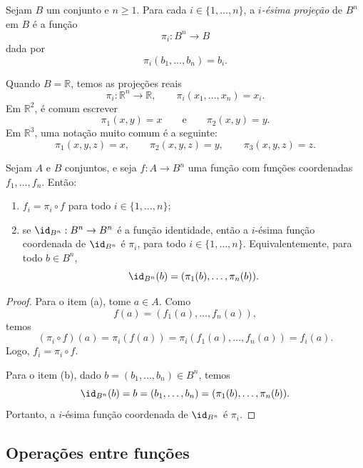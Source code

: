 \begin{definition}
    Sejam $B$ um conjunto e $n\geq 1$.
    Para cada $i\in\{1,\ldots,n\}$, a \emph{$i$-ésima projeção} de $B^n$ em $B$ é a função
    \[
        \pi_i:B^n\to B
    \]
    dada por
    \[
        \pi_i(b_1,\ldots,b_n)=b_i.
    \]
\end{definition}

Quando $B=\mathbb R$, temos as projeções reais
\[
    \pi_i:\mathbb R^n\to\mathbb R,
    \qquad
    \pi_i(x_1,\ldots,x_n)=x_i.
\]
Em $\mathbb R^2$, é comum escrever
\[
    \pi_1(x,y)=x
    \qquad\text{e}\qquad
    \pi_2(x,y)=y.
\]
Em $\mathbb R^3$, uma notação muito comum é a seguinte:
\[
    \pi_1(x,y,z)=x,\qquad
    \pi_2(x,y,z)=y,\qquad
    \pi_3(x,y,z)=z.
\]

\begin{proposition}
    Sejam $A$ e $B$ conjuntos, e seja $f:A\to B^n$ uma função com funções coordenadas $f_1,\ldots,f_n$.
    Então:
    \begin{enumerate}[label=(\alph*)]
        \item $f_i=\pi_i\circ f$ para todo $i\in\{1,\ldots,n\}$;
        \item se $\id_{B^n}:B^n\to B^n$ é a função identidade, então a $i$-ésima função coordenada de $\id_{B^n}$ é $\pi_i$, para todo $i\in\{1,\ldots,n\}$.
        Equivalentemente, para todo $b \in B^n$,
        \[
            \id_{B^n}(b)=(\pi_1(b),\ldots,\pi_n(b)).
        \]
    \end{enumerate}
\end{proposition}

\begin{proof}
    Para o item (a), tome $a\in A$.
    Como
    \[
        f(a)=(f_1(a),\ldots,f_n(a)),
    \]
    temos
    \[
        (\pi_i\circ f)(a)
        =
        \pi_i(f(a))
        =
        \pi_i(f_1(a),\ldots,f_n(a))
        =
        f_i(a).
    \]
    Logo, $f_i=\pi_i\circ f$.

    Para o item (b), dado $b=(b_1,\ldots,b_n)\in B^n$, temos
    \[
        \id_{B^n}(b)=b=(b_1,\ldots,b_n)=(\pi_1(b),\ldots,\pi_n(b)).
    \]
    Portanto, a $i$-ésima função coordenada de $\id_{B^n}$ é $\pi_i$.
\end{proof}

\subsection{Operações entre funções}

